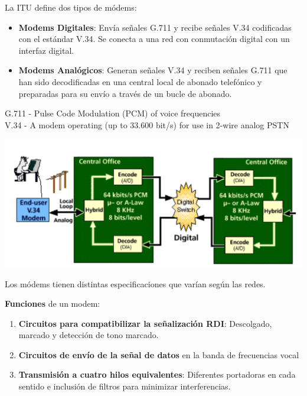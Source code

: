 \documentclass[10pt,portrait, twocolumn]{article}
\begin{document}
La ITU define dos tipos de módems:

\begin{itemize}
	\item \textbf{Modems Digitales}: Envía señales G.711 y recibe señales V.34 codificadas con el estándar V.34. Se conecta a una red con conmutación digital con un interfaz digital.
	\item \textbf{Modems Analógicos}: Generan señales V.34 y reciben señales G.711 que han sido decodificadas en una central local de abonado telefónico y preparadas para su envío a través de un bucle de abonado.
\end{itemize}

\begin{center}
	{\scriptsize G.711 - Pulse Code Modulation (PCM) of voice frequencies\\
	V.34 - A modem operating (up to 33.600 bit/s) for use in 2-wire analog PSTN}
\end{center}


	\begin{center}
		\includegraphics[scale=0.2]{images/SpecsModem}
	\end{center}

Los módems tienen distintas especificaciones que varían según las redes.

\textbf{Funciones} de un modem:

	\begin{enumerate}
		\item \textbf{Circuitos para compatibilizar la señalización RDI}: Descolgado, marcado y detección de tono marcado.
		\item \textbf{Circuitos de envío de la señal de datos} en la banda de frecuencias vocal
		\item \textbf{Transmisión a cuatro hilos equivalentes}: Diferentes portadoras en cada sentido e inclusión de filtros para minimizar interferencias.
	\end{enumerate}
	
\end{document}
